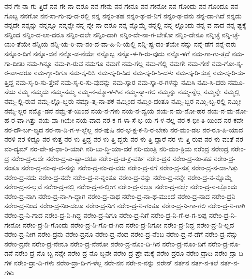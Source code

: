 {ನನ-ಗೇ-ನಾ-ಗು-ತ್ತಿದೆ
ನನ-ಗೇ-ನಾ-ದರೂ
ನನ-ಗೇನು
ನನ-ಗೇನೂ
ನನ-ಗೇನೋ
ನನ-ಗೊಂದು
ನನ-ಗೊಂದೂ
ನನ-ಗೊಬ್ಬ
ನನಗೋ
ನನ-ಸಾ-ಗು-ವು-ದ-ರಲ್ಲಿ
ನನ್ನ
ನನ್ನಂ-ತಹ
ನನ್ನಂ-ಥ-ವ-ನಿಗೆ
ನನ್ನಂ-ಥ-ವನು
ನನ್ನ-ದಾ-ಗಿದೆ
ನನ್ನದು
ನನ್ನದೇ
ನನ್ನನ್ನು
ನನ್ನನ್ನೂ
ನನ್ನನ್ನೇ
ನನ್ನ-ನ್ನೇ-ನಾ-ದರೂ
ನನ್ನ-ನ್ನೊಮ್ಮೆ
ನನ್ನಲ್ಲಿ
ನನ್ನ-ಲ್ಲೊಂದು
ನನ್ನ-ವ-ನಾದ
ನನ್ನ-ಷ್ಟಕ್ಕೆ
ನನ್ನಿಂದ
ನನ್ನಿಂ-ದ-ಲಾ-ದರೂ
ನನ್ನಿಂ-ದಲೇ
ನನ್ನಿಂ-ದಾಗಿ
ನನ್ನಿಂ-ದೇ-ನಾ-ಗ-ಬೇಕೋ
ನನ್ನಿಂ-ದೇನೂ
ನನ್ನಿಚ್ಛೆ
ನನ್ನಿ-ಚ್ಛೆ-ಯಂ-ತೆಯೇ
ನನ್ನಿಯ
ನನ್ನಿ-ಯ-ರಿ-ವಾ-ನಂ-ದ-ವಾ-ಹಿ-ನಿ-ಯೆಲ್ಲಿ
ನನ್ನಿ-ಷ್ಟ-ದಂ-ತೆಯೇ
ನನ್ನು
ನನ್ನೆ-ಡೆಗೆ
ನನ್ನೆ-ದರು
ನನ್ನೊಂ-ದಿಗೆ
ನನ್ನೊ-ಡನೆ
ನನ್ನೊ-ಡ-ನೆಯೇ
ನನ್ನೊಬ್ಬ
ನನ್ನೊ-ಳ-ಗಿ-ರು-ವುದು
ನನ್ನೊ-ಳಗೆ
ನಮ-ಗಾ-ಗು-ತ್ತದೆ
ನಮ-ಗಾ-ದೀತು
ನಮ-ಗಿನ್ನೂ
ನಮ-ಗಿ-ರುವ
ನಮಗೂ
ನಮಗೆ
ನಮ-ಗೆಲ್ಲ
ನಮ-ಗೆಲ್ಲಿ
ನಮಗೇ
ನಮ-ಗೇಕೆ
ನಮ-ಗೋ-ಸ್ಕ-ರ-ವಾ-ದರೂ
ನಮ-ಗ್ಯಾ-ರಿಗೂ
ನಮ-ಸ್ಕ-ರಿಸಿ
ನಮ-ಸ್ಕ-ರಿ-ಸಿದ
ನಮ-ಸ್ಕ-ರಿ-ಸಿ-ದಳು
ನಮ-ಸ್ಕ-ರಿ-ಸುತ್ತ
ನಮ-ಸ್ಕ-ರಿ-ಸು-ತ್ತಿದ್ದ
ನಮ-ಸ್ಕ-ರಿ-ಸು-ತ್ತೇನೆ
ನಮ-ಸ್ಕ-ರಿ-ಸು-ವುದನ್ನು
ನಮ-ಸ್ಕಾರ
ನಮ-ಸ್ಕಾ-ರ-ಗಳನ್ನು
ನಮಿಸಿ
ನಮಿ-ಸಿ-ದರು
ನಮೂ-ನೆಯ
ನಮ್ಮ
ನಮ್ಮದು
ನಮ್ಮ-ನಮ್ಮ
ನಮ್ಮ-ನ-ಮ್ಮೊ-ಳ-ಗಿನ
ನಮ್ಮ-ನ್ನಾ-ಗಲಿ
ನಮ್ಮನ್ನು
ನಮ್ಮ-ನ್ನೆಲ್ಲ
ನಮ್ಮನ್ನೇ
ನಮ್ಮಲ್ಲಿ
ನಮ್ಮ-ಲ್ಲಿ-ರುವ
ನಮ್ಮ-ಲ್ಲೊ-ಬ್ಬರು
ನಮ್ಮಾ-ತ್ಮ-ನಾ-ಶಕೆ
ನಮ್ಮಿಂದ
ನಮ್ಮಿಂ-ದಂತೂ
ನಮ್ಮಿ-ಬ್ಬರ
ನಮ್ಮಿ-ಬ್ಬ-ರಲ್ಲಿ
ನಮ್ಮೀ
ನಮ್ಮೆ-ಲ್ಲರ
ನಮ್ಮೊ-ಡನೆ
ನಮ್ರ-ತೆ-ಯಿಂದ
ನಯ-ನ-ಗಳು
ನಯ-ನ-ದ್ವಯ
ನಯ-ನ-ಮ-ನೋ-ಹರ
ನಯ-ನ-ಮ-ನೋ-ಹ-ರ-ವಾ-ಗಿತ್ತು
ನಯ-ವಾ-ಗಿಯೇ
ನಯ-ವಾದ
ನರ-ಕ-ಗ-ಳಾ-ಸೆ-ಭ-ಯ-ಗ-ಳ-ನೆಲ್ಲ
ನರ-ಕ-ಭೀ-ತಿ-ಯಿಂದ
ನರ-ಕವೇ
ನರ-ದೌ-ರ್ಬ-ಲ್ಯದ
ನರ-ನಾ-ಡಿ-ಗ-ಳ-ಲ್ಲೆಲ್ಲ
ನರ-ಪುಷಿ
ನರ-ಭ-ಕ್ಷ-ಕ-ನಿ-ರ-ಬೇಕು
ನರ-ಮಂ-ಡಲ
ನರ-ರೂ-ಪಿ-ಯಾದ
ನರಳಿ
ನರ-ಳಿದ್ದೂ
ನರ-ಳುತ್ತ
ನರ-ಳು-ತ್ತಿದ್ದ
ನರ-ಳು-ತ್ತಿ-ದ್ದರು
ನರ-ಳು-ತ್ತಿ-ದ್ದಾರೆ
ನರ-ಳು-ತ್ತಿ-ರುವ
ನರ-ಳು-ವಂತೆ
ನರ-ವಂ-ದ್ಯಮ್
ನರ-ವೇ-ಷ-ಧಾ-ರಿ-ಯಾಗಿ
ನರಿ-ಬು-ದ್ಧಿ-ಯಾ-ದರೆ
ನರಿ-ಮಂತ್ರಿ
ನರಿ-ಮಂ-ತ್ರಿಯ
ನರೆಂದ್ರ
ನರೇಂದ್ರ
ನರೇಂ-ದ್ರ
ನರೇಂ-ದ್ರ-ಅದೇ
ನರೇಂ-ದ್ರ-ಎ-ಷ್ಟಾ-ದರೂ
ನರೇಂ-ದ್ರ-ಚ-ಕ್ರ-ವರ್ತಿ
ನರೇಂ-ದ್ರನ
ನರೇಂ-ದ್ರ-ನಂ-ತಹ
ನರೇಂ-ದ್ರ-ನಂತೂ
ನರೇಂ-ದ್ರ-ನಂ-ಥ-ವ-ನನ್ನು
ನರೇಂ-ದ್ರ-ನಂ-ಥ-ವರು
ನರೇಂ-ದ್ರ-ನಗೆ
ನರೇಂ-ದ್ರ-ನತ್ತ
ನರೇಂ-ದ್ರ-ನ-ದಾ-ಗಿತ್ತು
ನರೇಂ-ದ್ರ-ನದು
ನರೇಂ-ದ್ರ-ನದೇ
ನರೇಂ-ದ್ರ-ನ-ನ್ನಂತೂ
ನರೇಂ-ದ್ರ-ನನ್ನು
ನರೇಂ-ದ್ರ-ನನ್ನೇ
ನರೇಂ-ದ್ರ-ನ-ನ್ನೊಮ್ಮೆ
ನರೇಂ-ದ್ರ-ನ-ಲ್ಲವೆ
ನರೇಂ-ದ್ರ-ನಲ್ಲಿ
ನರೇಂ-ದ್ರ-ನ-ಲ್ಲೀಗ
ನರೇಂ-ದ್ರ-ನಲ್ಲೂ
ನರೇಂ-ದ್ರ-ನಲ್ಲೇ
ನರೇಂ-ದ್ರ-ನ-ಲ್ಲೊಂದು
ನರೇಂ-ದ್ರ-ನಾಗಿ
ನರೇಂ-ದ್ರ-ನಾ-ಗಿ-ದ್ದಾಗ
ನರೇಂ-ದ್ರ-ನಾಥ
ನರೇಂ-ದ್ರ-ನಾ-ಥ-ಮುಂದೆ
ನರೇಂ-ದ್ರ-ನಾದ
ನರೇಂ-ದ್ರನಿ
ನರೇಂ-ದ್ರ-ನಿಂದ
ನರೇಂ-ದ್ರ-ನಿಂ-ದಲೂ
ನರೇಂ-ದ್ರ-ನಿಗ
ನರೇಂ-ದ್ರ-ನಿ-ಗಂತೂ
ನರೇಂ-ದ್ರ-ನಿ-ಗಾ-ಗಲಿ
ನರೇಂ-ದ್ರ-ನಿ-ಗಾಗಿ
ನರೇಂ-ದ್ರ-ನಿ-ಗಾದ
ನರೇಂ-ದ್ರ-ನಿ-ಗಿದ್ದ
ನರೇಂ-ದ್ರ-ನಿಗೂ
ನರೇಂ-ದ್ರ-ನಿಗೆ
ನರೇಂ-ದ್ರ-ನಿ-ಗೆ-ಆ-ಗ-ಲಪ್ಪ
ನರೇಂ-ದ್ರ-ನಿ-ಗೇನೋ
ನರೇಂ-ದ್ರ-ನಿ-ಗೊಂದು
ನರೇಂ-ದ್ರ-ನಿ-ಗೊ-ದ-ಗಿದ
ನರೇಂ-ದ್ರ-ನಿಗೋ
ನರೇಂ-ದ್ರ-ನಿದ್ದ
ನರೇಂ-ದ್ರ-ನಿ-ಲ್ಲದ
ನರೇಂ-ದ್ರ-ನೀಗ
ನರೇಂ-ದ್ರನು
ನರೇಂ-ದ್ರನೂ
ನರೇಂ-ದ್ರ-ನೆಂದ
ನರೇಂ-ದ್ರ-ನೆಂಬ
ನರೇಂ-ದ್ರ-ನೆ-ಡೆಗೆ
ನರೇಂ-ದ್ರ-ನೆನ್ನು
ನರೇಂ-ದ್ರನೇ
ನರೇಂ-ದ್ರ-ನೇನೂ
ನರೇಂ-ದ್ರ-ನೇನೋ
ನರೇಂ-ದ್ರ-ನೊಂ-ದಿ-ಗಿನ
ನರೇಂ-ದ್ರ-ನೊಂ-ದಿಗೆ
ನರೇಂ-ದ್ರ-ನೊ-ಡನೆ
ನರೇಂ-ದ್ರ-ನೊ-ಬ್ಬ-ನನ್ನೇ
ನರೇಂ-ದ್ರ-ನೊ-ಬ್ಬನೇ
ನರೇಂ-ದ್ರ-ಪ್ರೇ-ಮಕ್ಕೆ
ನರೇಂ-ದ್ರರೂ
ನರೇಂ-ದ್ರಾದಿ
ನರೇಂ-ದ್ರಾ-ದಿ-ಗಳ
ನರೇಂ-ದ್ರಾ-ದಿ-ಗಳು
ನರೇಂ-ದ್ರಾ-ದಿ-ಗ-ಳೆಲ್ಲ
ನರೇ-ನನ
ನರೇ-ನ-ನನ್ನು
ನರೇನ್
ನರ್ತನ
ನರ್ತ-ನ-ಕಲೆ
ನರ್ತ-ನ-ಗಳು
}
